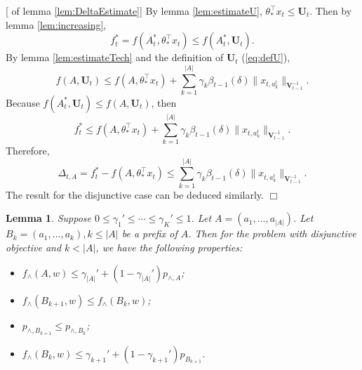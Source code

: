\documentclass{article}
\newcommand{\bU}{\mathbf{U}}
\newcommand{\bV}{\mathbf{V}}
\newcommand{\abs}[1]{\left| #1 \right|}
\newcommand{\norm}[1]{\| #1 \|}
\newtheorem{lemma}[theorem]{Lemma}%
\newenvironment{proof}{\noindent {\textbf{Proof. }}}{$\Box$ \medskip}
\begin{document}
\begin{proof}[ of lemma \ref{lem:DeltaEstimate}]
By lemma \ref{lem:estimateU}, $\theta_{\ast}^{\top}x_t \leq \bU_t$. Then by lemma \ref{lem:increasing},
$$
f_t^{\ast} = f(A_t^{\ast}, \theta_{\ast}^{\top}x_t) \leq f(A_t^{\ast}, \bU_t).
$$
By lemma \ref{lem:estimateTech} and the definition of $\bU_t$ (\ref{eq:defU}),
$$
f(A, \bU_t) \leq f(A, \theta_{\ast}^{\top}x_t) + \sum_{k=1}^{\abs{A}} \gamma_k \beta_{t-1}(\delta)\norm{x_{t, a_k^t}}_{\bV_{t-1}^{-1}}.
$$
Because $f(A_t^{\ast}, \bU_t) \leq f(A, \bU_t)$, then 
$$
f_t^{\ast} \leq f(A, \theta_{\ast}^{\top}x_t) + \sum_{k=1}^{\abs{A}} \gamma_k \beta_{t-1}(\delta)\norm{x_{t, a_k^t}}_{\bV_{t-1}^{-1}}.
$$
Therefore,
$$
\Delta_{t, A} = f_t^{\ast} - f(A, \theta_{\ast}^{\top}x_t) \leq \sum_{k=1}^{\abs{A}} \gamma_k \beta_{t-1}(\delta)\norm{x_{t, a_k^t}}_{\bV_{t-1}^{-1}}.
$$
The result for the disjunctive case can be deduced similarly.
\end{proof}

\begin{lemma}
\label{lem:prefixRelation}
Suppose 
$0 \leq \gamma_1' \leq \cdots \leq \gamma_K' \leq 1$. Let $A = (a_1, ..., a_{\abs{A}})$. 
Let $B_k = (a_1, ..., a_k), k \leq \abs{A}$ be a prefix of $A$. Then for the problem with disjunctive objective and $k < \abs{A}$, we have the following properties:
\begin{itemize}
\item[(1)] $f_{\wedge}(A, w) \leq \gamma_{\abs{A}}' + (1 - \gamma_{\abs{A}}') p_{\wedge, A}$;
\item[(2)] $f_{\wedge}(B_{k+1}, w) \leq f_{\wedge}(B_k, w)$;
\item[(3)] $p_{\wedge, B_{k+1}} \leq p_{\wedge, B_k}$;
\item[(4)] $f_{\wedge}(B_k, w) \leq \gamma_{k+1}' + (1 - \gamma_{k+1}') p_{B_{k+1}}$.
\end{itemize}
\end{lemma}
\end{document}
